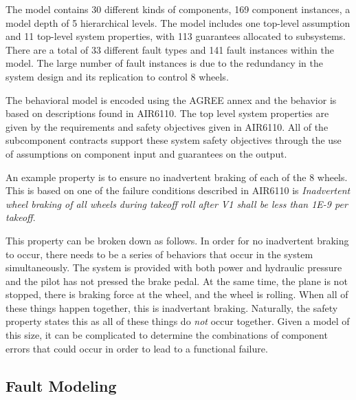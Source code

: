 
The model contains 30 different kinds of components, 169 component instances, a model depth of 5 hierarchical levels.  The model includes one top-level assumption and  11 top-level system properties, with 113 guarantees allocated to subsystems.  There are a total of 33 different fault types and 141 fault instances within the model.  The large number of fault instances is due to the redundancy in the system design and its replication to control 8 wheels.

The behavioral model is encoded using the AGREE annex and the behavior is based on descriptions found in AIR6110. The top level system properties are given by the requirements and safety objectives given in AIR6110. All of the subcomponent contracts support these system safety objectives through the use of assumptions on component input and guarantees on the output.

An example property is to ensure no inadvertent braking of each of the 8 wheels. This is based on one of the failure conditions described in AIR6110 is \textit{Inadvertent wheel braking of all wheels during takeoff roll after V1 shall be less than 1E-9 per takeoff}. 

This property can be broken down as follows. In order for no inadvertent braking to occur, there needs to be a series of behaviors that occur in the system simultaneously. The system is provided with both power and hydraulic pressure and the pilot has not pressed the brake pedal. At the same time, the plane is not stopped, there is braking force at the wheel, and the wheel is rolling. When all of these things happen together, this is inadvertant braking. Naturally, the safety property states this as all of these things do \textit{not} occur together. Given a model of this size, it can be complicated to determine the combinations of component errors that could occur in order to lead to a functional failure.


\subsection{Fault Modeling}

